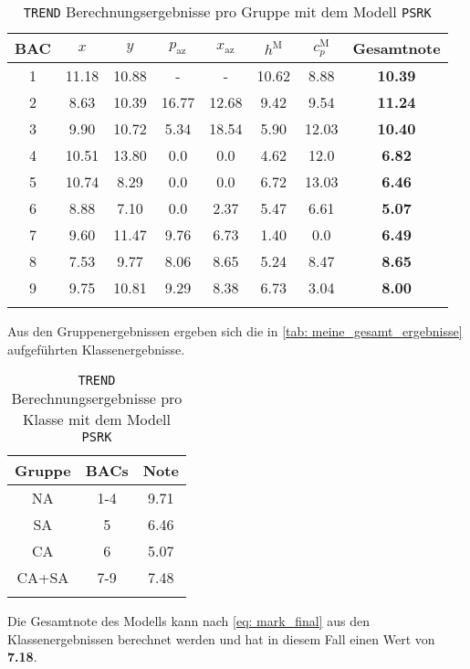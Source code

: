 \documentclass[../thesis.tex]{subfiles}
\begin{document}
\begin{table} [htb]
	\centering
	\caption{\texttt{TREND} Berechnungsergebnisse pro Gruppe mit dem Modell \texttt{PSRK}}
	\begin{tabular}{ cccccccc }
		\hline
		BAC & $ x $ & $ y $ & $ p_\mathrm{az}$ & $ x_\mathrm{az}$ & $ h^\mathrm{M} $ & $ c_p^\mathrm{M} $ & \textbf{Gesamtnote} \\
		\hline
		1 & 11.18 & 10.88 & -     & -     & 10.62 & 8.88  & \textbf{10.39}\\
		2 & 8.63  & 10.39 & 16.77 & 12.68 & 9.42  & 9.54  & \textbf{11.24}\\
		3 & 9.90  & 10.72 & 5.34  & 18.54 & 5.90  & 12.03 & \textbf{10.40}\\
		4 & 10.51 & 13.80 & 0.0   & 0.0   & 4.62  & 12.0  & \textbf{6.82}\\
		5 & 10.74 & 8.29  & 0.0   & 0.0   & 6.72  & 13.03 & \textbf{6.46}\\
		6 & 8.88  & 7.10  & 0.0   & 2.37  & 5.47  & 6.61  & \textbf{5.07}\\
		7 & 9.60  & 11.47 & 9.76  & 6.73  & 1.40  & 0.0   & \textbf{6.49}\\
		8 & 7.53  & 9.77  & 8.06  & 8.65  & 5.24  & 8.47  & \textbf{8.65}\\
		9 & 9.75  & 10.81 & 9.29  & 8.38  & 6.73  & 3.04  & \textbf{8.00}\\
		\hline
		\label{tab: meine_bac_ergebnisse}
	\end{tabular}
\end{table}


Aus den Gruppenergebnissen ergeben sich die in \autoref{tab: meine_gesamt_ergebnisse} aufgeführten Klassenergebnisse.

\begin{table} [htb]
	\centering
	\caption{\texttt{TREND} Berechnungsergebnisse pro Klasse mit dem Modell \texttt{PSRK}}
	\begin{tabular}{ ccc }
		\hline
		Gruppe & BACs & Note  \\
		\hline
		NA & 1-4 & 9.71 \\
		SA & 5   & 6.46 \\
		CA & 6   & 5.07 \\
		CA+SA & 7-9 & 7.48 \\ 
	
		\hline
		\label{tab: meine_gesamt_ergebnisse}
	\end{tabular}
\end{table}

Die Gesamtnote des Modells kann nach \autoref{eq: mark_final} aus den Klassenergebnissen berechnet werden und hat in diesem Fall einen Wert von \textbf{7.18}.
\end{document}
